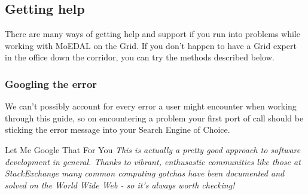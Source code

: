 \subsection{Getting help}
\label{sec:help}
There are many ways of getting help and support if you run into problems
while working with MoEDAL on the Grid.
If you don't happen
to have a Grid expert in the office down the corridor, you can try the
methods described below.

\subsubsection{Googling the error}
\label{sec:googleerror}
We can't possibly account for every error a user might encounter when
working through this guide, so on encountering a problem your
first port of call should be sticking the error message into your Search
Engine of Choice.

\begin{hintbox}{Let Me Google That For You}
\emph{This is actually a pretty good approach to software development in
general. Thanks to vibrant, enthusastic communities like those at
StackExchange many common computing gotchas have been documented and
solved on the World Wide Web - so it's always worth checking!}
\end{hintbox}

